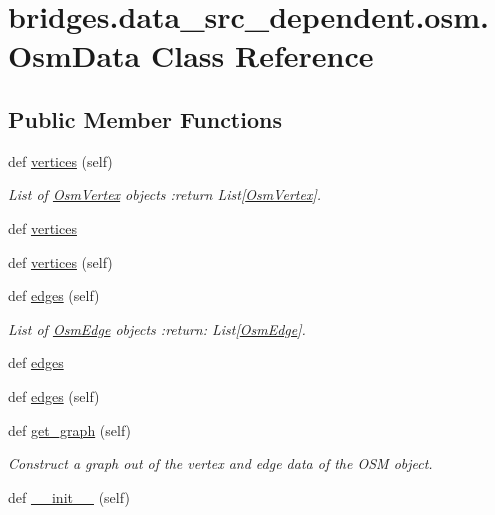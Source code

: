 \hypertarget{classbridges_1_1data__src__dependent_1_1osm_1_1_osm_data}{}\section{bridges.\+data\+\_\+src\+\_\+dependent.\+osm.\+Osm\+Data Class Reference}
\label{classbridges_1_1data__src__dependent_1_1osm_1_1_osm_data}
\subsection*{Public Member Functions}
\begin{DoxyCompactItemize}
\item 
def \mbox{\hyperlink{classbridges_1_1data__src__dependent_1_1osm_1_1_osm_data_a9d254d1ef4043909d4d2bd4427daae39}{vertices}} (self)
\begin{DoxyCompactList}\small\item\em List of \mbox{\hyperlink{classbridges_1_1data__src__dependent_1_1osm_1_1_osm_vertex}{Osm\+Vertex}} objects \+:return List\mbox{[}\mbox{\hyperlink{classbridges_1_1data__src__dependent_1_1osm_1_1_osm_vertex}{Osm\+Vertex}}\mbox{]}. \end{DoxyCompactList}\item 
def \mbox{\hyperlink{classbridges_1_1data__src__dependent_1_1osm_1_1_osm_data_aaf96716b8b7e7c5810d8858cb3463a8d}{vertices}}
\item 
def \mbox{\hyperlink{classbridges_1_1data__src__dependent_1_1osm_1_1_osm_data_a9d254d1ef4043909d4d2bd4427daae39}{vertices}} (self)
\item 
def \mbox{\hyperlink{classbridges_1_1data__src__dependent_1_1osm_1_1_osm_data_a1ec1018524a570304e80fb662e266f12}{edges}} (self)
\begin{DoxyCompactList}\small\item\em List of \mbox{\hyperlink{classbridges_1_1data__src__dependent_1_1osm_1_1_osm_edge}{Osm\+Edge}} objects \+:return\+: List\mbox{[}\mbox{\hyperlink{classbridges_1_1data__src__dependent_1_1osm_1_1_osm_edge}{Osm\+Edge}}\mbox{]}. \end{DoxyCompactList}\item 
def \mbox{\hyperlink{classbridges_1_1data__src__dependent_1_1osm_1_1_osm_data_a9a25900d86edcef59c6635ffae2dc5c3}{edges}}
\item 
def \mbox{\hyperlink{classbridges_1_1data__src__dependent_1_1osm_1_1_osm_data_a1ec1018524a570304e80fb662e266f12}{edges}} (self)
\item 
def \mbox{\hyperlink{classbridges_1_1data__src__dependent_1_1osm_1_1_osm_data_a50b43937ae7d87ac21378ed100fce657}{get\+\_\+graph}} (self)
\begin{DoxyCompactList}\small\item\em Construct a graph out of the vertex and edge data of the O\+SM object. \end{DoxyCompactList}\item 
def \mbox{\hyperlink{classbridges_1_1data__src__dependent_1_1osm_1_1_osm_data_ab36ec2f4933157aed6c28a02b258afee}{\+\_\+\+\_\+init\+\_\+\+\_\+}} (self)
\end{DoxyCompactItemize}
